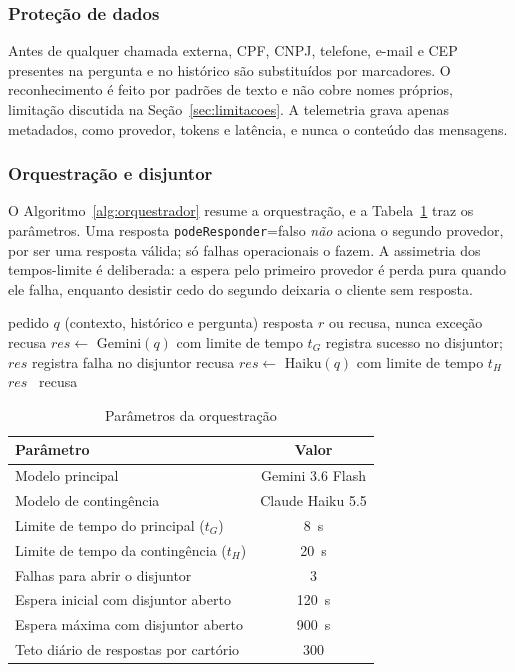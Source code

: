 \documentclass[conference]{IEEEtran}
\begin{document}
\subsubsection{Proteção de dados}
Antes de qualquer chamada externa, CPF, CNPJ, telefone, e-mail e CEP presentes na pergunta e no histórico são substituídos por marcadores. O reconhecimento é feito por padrões de texto e não cobre nomes próprios, limitação discutida na Seção~\ref{sec:limitacoes}. A telemetria grava apenas metadados, como provedor, tokens e latência, e nunca o conteúdo das mensagens.

\subsubsection{Orquestração e disjuntor}
O Algoritmo~\ref{alg:orquestrador} resume a orquestração, e a Tabela~\ref{tab:parametros} traz os parâmetros. Uma resposta \texttt{podeResponder}=falso \emph{não} aciona o segundo provedor, por ser uma resposta válida; só falhas operacionais o fazem. A assimetria dos tempos-limite é deliberada: a espera pelo primeiro provedor é perda pura quando ele falha, enquanto desistir cedo do segundo deixaria o cliente sem resposta.

\begin{algorithm}[t]
\caption{Orquestração entre provedores}
\label{alg:orquestrador}
\begin{algorithmic}[1]
\Require pedido $q$ (contexto, histórico e pergunta)
\Ensure resposta $r$ ou recusa, nunca exceção
 \Return recusa \EndIf
{}
  \State $res\gets$ Gemini$(q)$ com limite de tempo $t_G$
    \State registra sucesso no disjuntor; \Return $res$
  \Else
    \State registra falha no disjuntor
  \EndIf
\EndIf
{}
  \State \Return recusa
\EndIf
\State $res\gets$ Haiku$(q)$ com limite de tempo $t_H$
 \Return $res$ \Else\ \Return recusa \EndIf
\end{algorithmic}
\end{algorithm}

\begin{table}[t]
\caption{Parâmetros da orquestração}
\label{tab:parametros}
\centering
\footnotesize
\begin{tabular}{@{}lc@{}}
\toprule
\textbf{Parâmetro} & \textbf{Valor} \\
\midrule
Modelo principal & Gemini 3.6 Flash \\
Modelo de contingência & Claude Haiku 5.5 \\
Limite de tempo do principal ($t_G$) & 8~s \\
Limite de tempo da contingência ($t_H$) & 20~s \\
Falhas para abrir o disjuntor & 3 \\
Espera inicial com disjuntor aberto & 120~s \\
Espera máxima com disjuntor aberto & 900~s \\
Teto diário de respostas por cartório & 300 \\
\bottomrule
\end{tabular}
\end{table}
\end{document}
